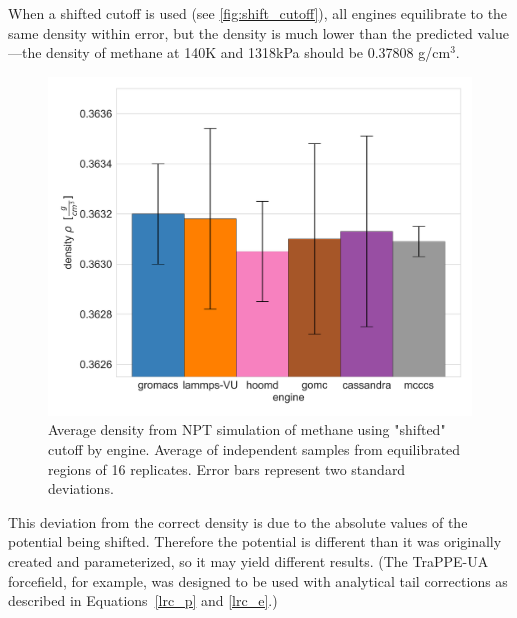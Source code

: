 When a shifted cutoff is used (see \autoref{fig:shift_cutoff}), all engines equilibrate to the same density within error, but the density is much lower than the predicted value---the density of methane at 140K and 1318kPa should be 0.37808 g/cm$^3$\cite{NISTwebbook}.
\begin{figure}[h!]
    \centering
    \includegraphics[width=0.8\linewidth,keepaspectratio]{figures/rep_study/shift_cutoff.png}
    \caption{Average density from NPT simulation of methane using "shifted" cutoff by engine. Average of independent samples from equilibrated regions of 16 replicates. Error bars represent two standard deviations.}\label{fig:shift_cutoff}
\end{figure}
This deviation from the correct density is due to the absolute values of the potential being shifted. 
Therefore the potential is different than it was originally created and parameterized, so it may yield different results.
(The TraPPE-UA forcefield, for example, was designed to be used with analytical tail corrections as described in Equations~\eqref{lrc_p} and \eqref{lrc_e}.)

